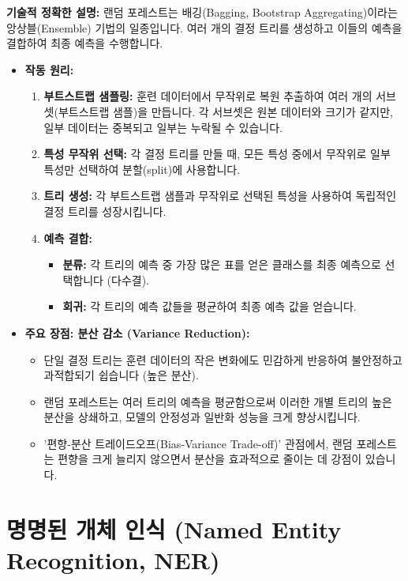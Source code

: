 \documentclass[11pt,a4paper]{article}
\theoremstyle{definition}
\begin{document}
\textbf{기술적 정확한 설명:}
랜덤 포레스트는 배깅(Bagging, Bootstrap Aggregating)이라는 앙상블(Ensemble) 기법의 일종입니다. 여러 개의 결정 트리를 생성하고 이들의 예측을 결합하여 최종 예측을 수행합니다.

\begin{itemize}
    \item \textbf{작동 원리:}
        \begin{enumerate}
            \item \textbf{부트스트랩 샘플링:} 훈련 데이터에서 무작위로 복원 추출하여 여러 개의 서브셋(부트스트랩 샘플)을 만듭니다. 각 서브셋은 원본 데이터와 크기가 같지만, 일부 데이터는 중복되고 일부는 누락될 수 있습니다.
            \item \textbf{특성 무작위 선택:} 각 결정 트리를 만들 때, 모든 특성 중에서 무작위로 일부 특성만 선택하여 분할(split)에 사용합니다.
            \item \textbf{트리 생성:} 각 부트스트랩 샘플과 무작위로 선택된 특성을 사용하여 독립적인 결정 트리를 성장시킵니다.
            \item \textbf{예측 결합:}
                \begin{itemize}
                    \item \textbf{분류:} 각 트리의 예측 중 가장 많은 표를 얻은 클래스를 최종 예측으로 선택합니다 (다수결).
                    \item \textbf{회귀:} 각 트리의 예측 값들을 평균하여 최종 예측 값을 얻습니다.
                \end{itemize}
        \end{enumerate}
    \item \textbf{주요 장점: 분산 감소 (Variance Reduction):}
        \begin{itemize}
            \item 단일 결정 트리는 훈련 데이터의 작은 변화에도 민감하게 반응하여 불안정하고 과적합되기 쉽습니다 (높은 분산).
            \item 랜덤 포레스트는 여러 트리의 예측을 평균함으로써 이러한 개별 트리의 높은 분산을 상쇄하고, 모델의 안정성과 일반화 성능을 크게 향상시킵니다.
            \item '편향-분산 트레이드오프(Bias-Variance Trade-off)' 관점에서, 랜덤 포레스트는 편향을 크게 늘리지 않으면서 분산을 효과적으로 줄이는 데 강점이 있습니다.
        \end{itemize}
\end{itemize}

\newpage
\section{명명된 개체 인식 (Named Entity Recognition, NER)}
\end{document}
